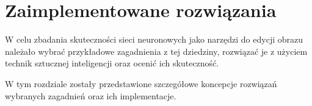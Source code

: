 \documentclass[10pt, a4paper, twoside, notitlepage, openright]{article}
\begin{document}






%
%
%
%
%

\setcounter{page}{2}




\newpage
  \tableofcontents









\section{Zaimplementowane rozwiązania}  \label{zaimplementowane rozwiazania}

  W celu zbadania skuteczności sieci neuronowych jako narzędzi do edycji obrazu
  należało wybrać przykładowe zagadnienia z tej dziedziny, rozwiązać je z
  użyciem technik sztucznej inteligencji oraz ocenić ich skuteczność.

  W tym rozdziale zostały przedstawione szczegółowe koncepcje rozwiązań wybranych
  zagadnień oraz ich implementacje.
\end{document}
